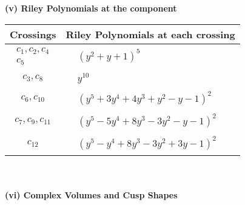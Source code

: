 \documentclass[1p]{elsarticle_modified}
\theoremstyle{definition}
\begin{document}
\newpage\renewcommand{\arraystretch}{1}
\flushleft \textbf{(v) Riley Polynomials at the component}\newline \\
\begin{tabular}{m{50pt}|m{274pt}}
Crossings & \hspace{64pt}Riley Polynomials at each crossing \\
\hline $$\begin{aligned}c_{1},c_{2},c_{4}\\c_{5}\end{aligned}$$&$\begin{aligned}
&(y^2+y+1)^5
\end{aligned}$\\
\hline $$\begin{aligned}c_{3},c_{8}\end{aligned}$$&$\begin{aligned}
&y^{10}
\end{aligned}$\\
\hline $$\begin{aligned}c_{6},c_{10}\end{aligned}$$&$\begin{aligned}
&(y^5+3 y^4+4 y^3+y^2- y-1)^2
\end{aligned}$\\
\hline $$\begin{aligned}c_{7},c_{9},c_{11}\end{aligned}$$&$\begin{aligned}
&(y^5-5 y^4+8 y^3-3 y^2- y-1)^2
\end{aligned}$\\
\hline $$\begin{aligned}c_{12}\end{aligned}$$&$\begin{aligned}
&(y^5- y^4+8 y^3-3 y^2+3 y-1)^2
\end{aligned}$\\
\hline
\end{tabular}\\~\\
\newpage\flushleft \textbf{(vi) Complex Volumes and Cusp Shapes}
\end{document}
